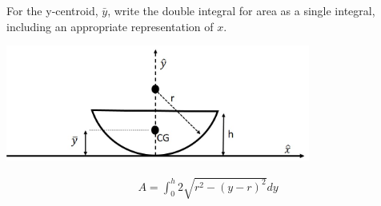 For the y-centroid, $\bar{y}$, write the double integral for area as a single integral, including an appropriate representation of $x$.

\begin{center}
    \includegraphics[width=0.75\textwidth]{img/ducky.png}
\end{center}

\begin{solution}
    \begin{align*}
        A = \int_{0}^{h} 2\sqrt{r^2 - \left(y - r\right)^2} dy
    \end{align*}
\end{solution}